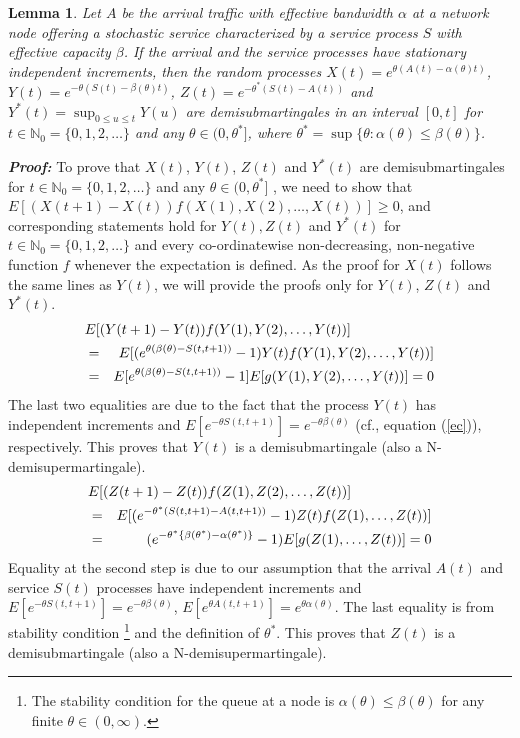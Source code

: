 \documentclass[letterpaper]{IEEEtran}
\newtheorem{lemma}{Lemma}[section]
\begin{document}
\begin{lemma}
\label{lemma:demi}
Let $A$ be the arrival traffic with effective bandwidth $\alpha$ at a network node offering a stochastic service characterized by a service process $S$ with effective capacity $\beta$. If the arrival and the service processes have stationary independent increments, then the random processes $X(t) = e^{\theta (A(t) - \alpha(\theta)t)}$, $Y(t) = e^{-\theta (S(t) - \beta(\theta)t)}$, $Z(t) = e^{-\theta^* (S(t) - A(t))}$  and $Y^*(t) = \sup_{0 \le u \le t} Y(u)$ are demisubmartingales in an interval $[0,t]$ for $t \in \mathbb{N}_0 = \{0, 1, 2, \ldots \}$ and any $\theta \in (0,\theta^*]$, where $\theta^* = \sup{\{\theta : \alpha(\theta) \le \beta(\theta)\}}$. 
\end{lemma}
\textbf{\textit{Proof:}} To prove that $X(t)$, $Y(t)$, $Z(t)$ and $Y^*(t)$ are demisubmartingales \cite{chris:2003,rao:2007} for $t \in \mathbb{N}_0 = \{0, 1, 2, \ldots \}$ and any $\theta \in (0,\theta^*]$ , we need to show that $E[(X(t+1)-X(t))f(X(1), X(2), \ldots, X(t))] \ge 0$, and corresponding statements hold for $Y(t), Z(t)$ and $Y^*(t)$ for $t \in \mathbb{N}_0 = \{0, 1, 2, \ldots \}$ and every co-ordinatewise non-decreasing, non-negative function $f$ whenever the expectation is defined. As the proof for $X(t)$ follows the same lines as $Y(t)$, we will provide the proofs only for $Y(t)$, $Z(t)$ and $Y^*(t)$.
\small
\begin{eqnarray*}
\lefteqn{E[(Y(t+1) - Y(t))f(Y(1), Y(2), \ldots, Y(t))]} \\
&=& E[(e^{\theta (\beta(\theta) - S(t,t+1))} - 1)Y(t)f(Y(1), Y(2), \ldots, Y(t))]\\
&=& E[e^{\theta (\beta(\theta) - S(t,t+1))} - 1]E[g(Y(1), Y(2), \ldots, Y(t))] = 0
\end{eqnarray*}
\normalsize
The last two equalities are due to the fact that the process $Y(t)$ has independent increments and $E[e^{-\theta S(t,t+1)}] = e^{-\theta \beta(\theta)}$ (cf., equation (\ref{ec})), respectively.  This proves that $Y(t)$ is a demisubmartingale (also a N-demisupermartingale). 
\small
\begin{eqnarray*}
\lefteqn{E[(Z(t+1) - Z(t))f(Z(1), Z(2), \ldots, Z(t))]} \\
&=& E[(e^{-\theta^* (S(t,t+1)-A(t,t+1))} - 1)Z(t)f(Z(1), \ldots, Z(t))]\\
&=& (e^{-\theta^* \{\beta(\theta^*)-\alpha(\theta^*)\}} - 1)E[g(Z(1), \ldots, Z(t))] = 0
\end{eqnarray*}
\normalsize
Equality at the second step is due to our assumption that the arrival $A(t)$ and service $S(t)$  processes have independent increments and $E[e^{-\theta S(t,t+1)}] = e^{-\theta \beta(\theta)}$, $E[e^{\theta A(t,t+1)}] = e^{\theta \alpha(\theta)}$. The last equality is from stability condition \footnote{The stability condition for the queue at a node is $\alpha(\theta) \le \beta(\theta)$ for any finite $\theta \in (0,\infty)$.} and the definition of $\theta^*$. This proves that $Z(t)$ is a demisubmartingale (also a N-demisupermartingale).
\end{document}
